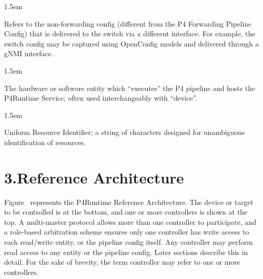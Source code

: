 \documentclass[11pt]{article}
\begin{document}
{\begin{mddefinitions}

\begin{mdbmarginx}{}{}{}{1.5em}%
\begin{mddefdata}%
Refers to the non-forwarding config (different from the P4 Forwarding
Pipeline Config) that is delivered to the switch via a different
interface. For example, the switch config may be captured using OpenConfig
models and delivered through a gNMI interface.
\end{mddefdata}%
\end{mdbmarginx}%


\begin{mdbmarginx}{}{}{}{1.5em}%
\begin{mddefdata}%
The hardware or software entity which \textquotedblleft{}executes\textquotedblright{} the P4 pipeline and hosts
the P4Runtime Service; often used interchangeably with \textquotedblleft{}device\textquotedblright{}.
\end{mddefdata}%
\end{mdbmarginx}%


\begin{mdbmarginx}{}{}{}{1.5em}%
\begin{mddefdata}%
Uniform Resource Identifier; a string of characters designed for unambiguous
identification of resources.%
\end{mddefdata}%
\end{mdbmarginx}%
\end{mddefinitions}%

\section{3.\hspace*{0.5em}Reference Architecture}\label{sec-reference-architecture}%

\noindent{}Figure~ represents the P4Runtime Reference
Architecture. The device or target to be controlled is at the bottom, and one or
more controllers is shown at the top. A multi-master protocol allows more than
one controller to participate, and a role-based arbitration scheme ensures only
one controller has write access to each read/write entity, or the pipeline config
itself. Any controller may perform read access to any entity or the pipeline
config. Later sections describe this in detail. For the sake of brevity, the
term controller may refer to one or more controllers.%

}
\end{document}
